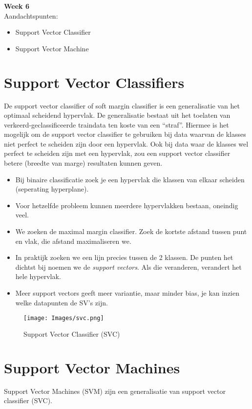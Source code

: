 {\large
\textbf{{\LARGE Week 6}}\\
Aandachtspunten:
\begin{itemize}
    \item Support Vector Classifier
    \item Support Vector Machine
\end{itemize}

\section{Support Vector Classifiers}
De support vector classifier of soft margin classifier is een
generalisatie van het optimaal scheidend hypervlak.
De generalisatie bestaat uit het toelaten van
verkeerd-geclassificeerde traindata ten koste van een “straf”.
Hiermee is het mogelijk om de support vector classifier te
gebruiken bij data waarvan de klasses niet perfect te scheiden
zijn door een hypervlak.
Ook bij data waar de klasses wel perfect te scheiden zijn met
een hypervlak, zou een support vector classifier betere
(breedte van marge) resultaten kunnen geven.

\begin{itemize}
    \item Bij binaire classificatie zoek je een hypervlak die klassen van elkaar scheiden (seperating hyperplane). 
    \item Voor hetzelfde probleem kunnen meerdere hypervlakken bestaan, oneindig veel.
    \item We zoeken de maximal margin classifier. Zoek de kortste afstand tussen punt en vlak, die afstand maximaliseren we.
    \item In praktijk zoeken we een lijn precies tussen de 2 klassen. De punten het dichtst bij noemen we de \textit{support vectors}. Als die veranderen, verandert het hele hypervlak.
    \item Meer support vectors geeft meer variantie, maar minder bias, je kan inzien welke datapunten de SV's zijn.
\end{itemize}
\begin{figure}[h]
    \centering
    \texttt{[image: Images/svc.png]}
    \caption{Support Vector Classifier (SVC)}
    \label{fig:pca}
\end{figure}

\section{Support Vector Machines}
Support Vector Machines (SVM) zijn een generalisatie van support vector classifier (SVC).\\

}
